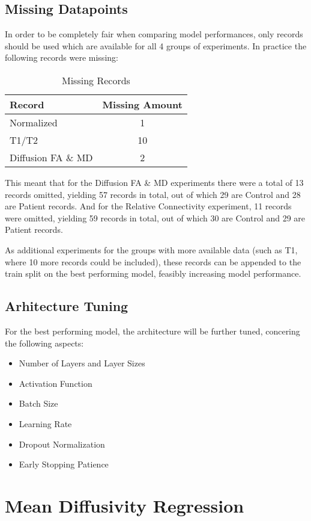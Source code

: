 \subsection{Missing Datapoints}

In order to be completely fair when comparing model performances, only records should be used which are available for all 4 groups of experiments. In practice the following records were missing:
\begin{table}[H]
\centering
\begin{tabular}{|l|c|}
\hline
\textbf{Record} & \textbf{Missing Amount} \\ \hline
Normalized & 1 \\ \hline
T1/T2 & 10 \\ \hline
Diffusion \ac{FA} \& \ac{MD} & 2 \\ \hline
\end{tabular}
\caption{Missing Records}
\end{table}
This meant that for the Diffusion \ac{FA} \& \ac{MD} experiments there were a total of 13 records omitted, yielding 57 records in total, out of which 29 are Control and 28 are Patient records. And for the Relative Connectivity experiment, 11 records were omitted, yielding 59 records in total, out of which 30 are Control and 29 are Patient records.\par
As additional experiments for the groups with more available data (such as T1, where 10 more records could be included), these records can be appended to the train split on the best performing model, feasibly increasing model performance.

\subsection{Arhitecture Tuning}

For the best performing model, the architecture will be further tuned, concering the following aspects:
\begin{itemize}
  \item Number of Layers and Layer Sizes
  \item Activation Function
  \item Batch Size
  \item Learning Rate
  \item Dropout Normalization
  \item Early Stopping Patience
\end{itemize}

\section{Mean Diffusivity Regression}







